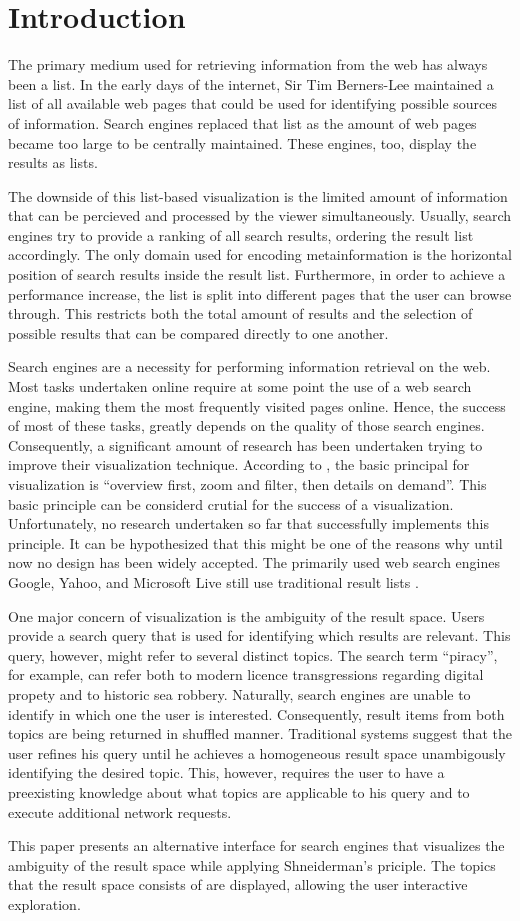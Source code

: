 \section{Introduction}
The primary medium used for retrieving information from the web has always been a list. In the early days of the internet, Sir Tim Berners-Lee maintained a list of all available web pages that could be used for identifying possible sources of information. Search engines replaced that list as the amount of web pages became too large to be centrally maintained. These engines, too, display the results as lists.

The downside of this list-based visualization is the limited amount of information that can be percieved and processed by the viewer simultaneously. Usually, search engines try to provide a ranking of all search results, ordering the result list accordingly. The only domain used for encoding metainformation is the horizontal position of search results inside the result list. Furthermore, in order to achieve a performance increase, the list is split into different pages that the user can browse through. This restricts both the total amount of results and the selection of possible results that can be compared directly to one another.

Search engines are a necessity for performing information retrieval on the web. Most tasks undertaken online require at some point the use of a web search engine, making them the most frequently visited pages online. Hence, the success of most of these tasks, greatly depends on the quality of those search engines. Consequently, a significant amount of research has been undertaken trying to improve their visualization technique. According to \cite{Shneiderman1996}, the basic principal for visualization is ``overview first, zoom and filter, then details on demand''. This basic principle can be considerd crutial for the success of a visualization. Unfortunately, no research undertaken so far that successfully implements this principle. It can be hypothesized that this might be one of the reasons why until now no design has been widely accepted. The primarily used web search engines Google, Yahoo, and Microsoft Live still use traditional result lists \cite{MostPopularWebSearchEngines}.

One major concern of visualization is the ambiguity of the result space. Users provide a search query that is used for identifying which results are relevant. This query, however, might refer to several distinct topics. The search term ``piracy'', for example, can refer both to modern licence transgressions regarding digital propety and to historic sea robbery. Naturally, search engines are unable to identify in which one the user is interested. Consequently, result items from both topics are being returned in shuffled manner. Traditional systems suggest that the user refines his query until he achieves a homogeneous result space unambigously identifying the desired topic. This, however, requires the user to have a preexisting knowledge about what topics are applicable to his query and to execute additional network requests.

This paper presents an alternative interface for search engines that visualizes the ambiguity of the result space while applying Shneiderman's priciple. The topics that the result space consists of are displayed, allowing the user interactive exploration.